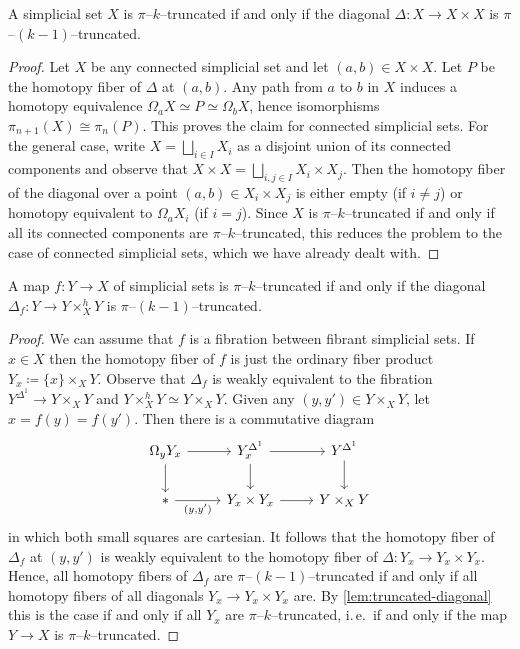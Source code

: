 \begin{lemma}\label{lem:truncated-diagonal}
  A simplicial set \(X\) is \(\pi\)--\(k\)--truncated if and only if the diagonal \(\Delta\colon X\to X\times X\) is \(\pi\)--\((k-1)\)--truncated.
\end{lemma}
\begin{proof}
  Let \(X\) be any connected simplicial set and let \((a,b)\in X\times X\). Let \(P\) be the homotopy fiber of \(\Delta\) at \((a,b)\).  Any path from \(a\) to \(b\) in \(X\) induces a homotopy equivalence \(\Omega_{a}X \simeq P \simeq \Omega_{b} X\), hence isomorphisms \(\pi_{n+1}(X)\cong \pi_{n}(P)\). This proves the claim for connected simplicial sets. For the general case, write \(X = \bigsqcup_{i\in I} X_{i}\) as a disjoint union of its connected components and observe that \(X\times X = \bigsqcup_{i,j\in I} X_{i}\times X_{j}\). Then the homotopy fiber of the diagonal over a point \((a,b)\in X_{i}\times X_{j}\) is either empty (if \(i\neq j\)) or homotopy equivalent to \(\Omega_{a}X_{i}\) (if \(i = j\)). Since \(X\) is \(\pi\)--\(k\)--truncated if and only if all its connected components are \(\pi\)--\(k\)--truncated, this reduces the problem to the case of connected simplicial sets, which we have already dealt with.
\end{proof}

\begin{lemma}\label{lem:relative-truncated-diagonal}
  A map \(f\colon Y\to X\) of simplicial sets is \(\pi\)--\(k\)--truncated if and only if the diagonal \(\Delta_{f}\colon Y\to Y\times^{h}_{X} Y\) is \(\pi\)--\((k-1)\)--truncated.
\end{lemma}
\begin{proof}
  We can assume that \(f\) is a fibration between fibrant simplicial sets. If \(x\in X\) then the homotopy fiber of \(f\) is just the ordinary fiber product \(Y_{x}\coloneqq \{x\}\times_{X} Y\). Observe that \(\Delta_{f}\) is weakly equivalent to the fibration \(Y^{\Delta^{1}}\to Y\times_{X} Y\) and \(Y\times_{X}^{h} Y \simeq Y\times_{X} Y\). Given any \((y, y')\in Y\times_{X} Y\), let \(x = f(y) = f(y')\). Then there is a commutative diagram
  \[
  \begin{tikzcd}
    \Omega_{y} Y_{x} \arrow[r] \arrow[d] & Y_{x}^{\Delta^{1}} \arrow[r] \arrow[d] & Y^{\Delta^{1}} \arrow[d] \\
    * \arrow[r, "{(y,y')}"'] & Y_{x}\times Y_{x} \arrow[r] & Y\times_{X} Y
  \end{tikzcd}
  \]
  in which both small squares are cartesian. It follows that the homotopy fiber of \(\Delta_{f}\) at \((y,y')\) is weakly equivalent to the homotopy fiber of \(\Delta\colon Y_{x}\to Y_{x}\times Y_{x}\). Hence, all homotopy fibers of \(\Delta_{f}\) are \(\pi\)--\((k-1)\)--truncated if and only if all homotopy fibers of all diagonals \(Y_{x}\to Y_{x}\times Y_{x}\) are. By \autoref{lem:truncated-diagonal} this is the case if and only if all \(Y_{x}\) are \(\pi\)--\(k\)--truncated, i.\,e.~if and only if the map \(Y\to X\) is \(\pi\)--\(k\)--truncated.
\end{proof}

